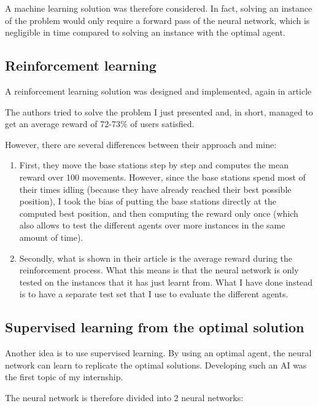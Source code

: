 \documentclass[letterpaper]{article}
\begin{document}
A machine learning solution was therefore considered.
In fact, solving an instance of the problem would only require a forward pass of the neural network, which is negligible in time compared to solving an instance with the optimal agent.

\subsection{Reinforcement learning}
\label{reinforcement}

A reinforcement learning solution was designed and implemented, again in article\;\cite{main_article}

The authors tried to solve the problem I just presented and, in short, managed to get an average reward of 72-73\% of users satisfied.

However, there are several differences between their approach and mine:

\begin{enumerate}
    \item First, they move the base stations step by step and computes the mean reward over 100 movements.
          However, since the base stations spend most of their times idling (because they have already reached their best possible position),
          I took the bias of putting the base stations directly at the computed best position, and then computing the reward only once (which also allows to test the different agents over more instances in the same amount of time).
    \item Secondly, what is shown in their article is the average reward during the reinforcement process.
        What this means is that the neural network is only tested on the instances that it has just learnt from.
        What I have done instead is to have a separate test set that I use to evaluate the different agents.
\end{enumerate}

\subsection{Supervised learning from the optimal solution}

Another idea is to use supervised learning.
By using an optimal agent, the neural network can learn to replicate the optimal solutions.
Developing such an AI was the first topic of my internship.

The neural network is therefore divided into 2 neural networks:
\end{document}
